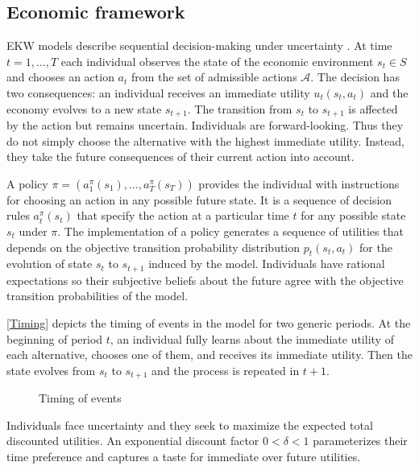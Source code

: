 \subsection{Economic framework}
EKW models describe sequential decision-making under uncertainty \citep{Gilboa.2009, Machina.2014}. At time $t = 1, \hdots, T$ each individual observes the state of the economic environment $s_t\in S$ and chooses an action $a_t$ from the set of admissible actions $\mathcal{A}$. The decision has two consequences: an individual receives an immediate utility $u_t(s_t, a_t)$ and the economy evolves to a new state $s_{t + 1}$. The transition from $s_t$ to $s_{t + 1}$ is affected by the action but remains uncertain. Individuals are forward-looking. Thus they do not simply choose the alternative with the highest immediate utility. Instead, they take the future consequences of their current action into account.

A policy $\pi = (a^\pi_1(s_1), \hdots, a^\pi_T(s_T))$ provides the individual with instructions for choosing an action in any possible future state. It is a sequence of decision rules $a^\pi_t(s_t)$ that specify the action at a particular time $t$ for any possible state $s_t$ under $\pi$. The implementation of a policy generates a sequence of utilities that depends on the objective transition probability distribution $p_t(s_t, a_t)$ for the evolution of state $s_t$ to $s_{t + 1}$ induced by the model. Individuals have rational expectations \citep{Muth.1961} so their subjective beliefs about the future agree with the objective transition probabilities of the model.

\autoref{Timing} depicts the timing of events in the model for two generic periods. At the beginning of period $t$, an individual fully learns about the immediate utility of each alternative, chooses one of them, and receives its immediate utility. Then the state evolves from $s_t$ to $s_{t + 1}$ and the process is repeated in $t + 1$.
%
\begin{figure}[t]
	\centering
	\scalebox{0.755}{}
	\caption{Timing of events}
	\label{Timing}
\end{figure}
%
\noindent Individuals face uncertainty and they seek to maximize the expected total discounted utilities. An exponential discount factor ${0 < \delta < 1}$ parameterizes their time preference and captures a taste for immediate over future utilities.


